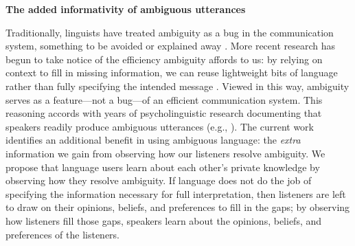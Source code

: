\documentclass[12pt]{article}
\begin{document}
\setlength{\abovedisplayskip}{0.5pt}
\setlength{\belowdisplayskip}{0.5pt}


\begin{center}
	\textbf{The added informativity of ambiguous utterances}
\end{center}

\vspace{-9pt}

\noindent 
Traditionally, linguists have treated ambiguity as a bug in the communication system, something to be avoided or explained away \citep{grice1975,chomsky2002minimalism}.
More recent research has begun to take notice of the efficiency ambiguity affords to us: by relying on context to fill in missing information, we can reuse lightweight bits of language rather than fully specifying the intended message \citep{levinson2000,piantadosietal2012,wasow2015}. 
Viewed in this way, ambiguity serves as a feature---not a bug---of an efficient communication system.
This reasoning accords with years of psycholinguistic research documenting that speakers readily produce ambiguous utterances (e.g., \citealp{ferreira2008}). The current work identifies an additional benefit in using ambiguous language: the \emph{extra} information we gain from observing how our listeners resolve ambiguity.
We propose that language users learn about each other's private knowledge by observing how they resolve ambiguity. If language does not do the job of specifying the information necessary for full interpretation, then listeners are left to draw on their opinions, beliefs, and preferences to fill in the gaps; by observing how listeners fill those gaps, speakers learn about the opinions, beliefs, and preferences of the listeners.
\end{document}
